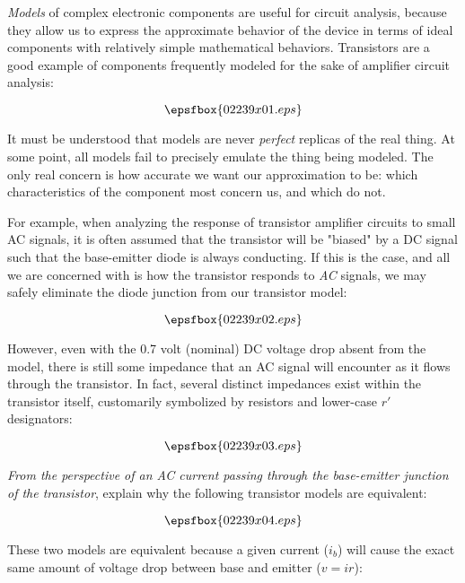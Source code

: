 

{\it Models} of complex electronic components are useful for circuit analysis, because they allow us to express the approximate behavior of the device in terms of ideal components with relatively simple mathematical behaviors.  Transistors are a good example of components frequently modeled for the sake of amplifier circuit analysis:

$$\epsfbox{02239x01.eps}$$

It must be understood that models are never {\it perfect} replicas of the real thing.  At some point, all models fail to precisely emulate the thing being modeled.  The only real concern is how accurate we want our approximation to be: which characteristics of the component most concern us, and which do not.

For example, when analyzing the response of transistor amplifier circuits to small AC signals, it is often assumed that the transistor will be "biased" by a DC signal such that the base-emitter diode is always conducting.  If this is the case, and all we are concerned with is how the transistor responds to {\it AC} signals, we may safely eliminate the diode junction from our transistor model:

$$\epsfbox{02239x02.eps}$$

However, even with the 0.7 volt (nominal) DC voltage drop absent from the model, there is still some impedance that an AC signal will encounter as it flows through the transistor.  In fact, several distinct impedances exist within the transistor itself, customarily symbolized by resistors and lower-case $r'$ designators:

$$\epsfbox{02239x03.eps}$$

{\it From the perspective of an AC current passing through the base-emitter junction of the transistor}, explain why the following transistor models are equivalent:

$$\epsfbox{02239x04.eps}$$







These two models are equivalent because a given current ($i_b$) will cause the exact same amount of voltage drop between base and emitter ($v = i r$):

